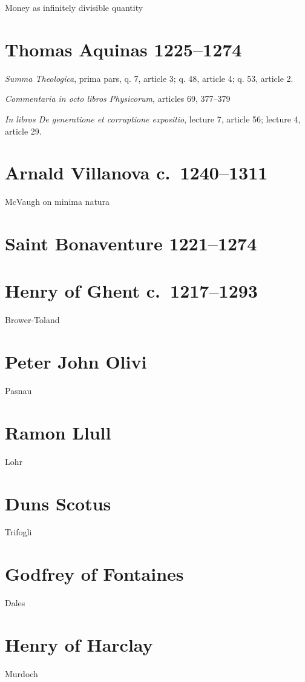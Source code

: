 \documentclass{article}
\begin{document}
Money as infinitely divisible quantity \cite{kaye}

\section{Thomas Aquinas 1225--1274}
{\em Summa Theologica}, prima pars, q. 7, article 3; q. 48, article 4; q. 53, article 2. 

{\em Commentaria in octo libros Physicorum}, articles 69, 377--379 \cite[pp.~188-189]{aquinas}

{\em In libros De generatione et corruptione expositio}, lecture 7, article 56; lecture 4, article 29.


\section{Arnald Villanova c.~1240--1311}
McVaugh on minima natura \cite[p.~97]{villanovaII}


\section{Saint Bonaventure 1221--1274}


\section{Henry of Ghent c.~1217--1293}
Brower-Toland \cite{brower-toland}

\section{Peter John Olivi}
Pasnau \cite{pasnau}

\section{Ramon Llull}
Lohr \cite{lohr2001}

\section{Duns Scotus}
Trifogli \cite{trifogli2004}


\section{Godfrey of Fontaines}
Dales \cite[pp.~185--186, 202--203, 233, 255]{dales}

\section{Henry of Harclay}
Murdoch \cite{harclay}
\end{document}
